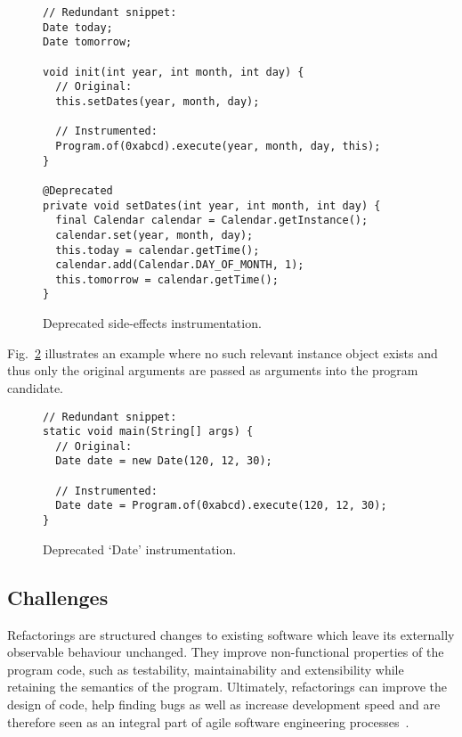 \documentclass[runningheads,a4paper]{llncs}
\begin{document}
\begin{figure}
\begin{lstlisting}[mathescape=true,showstringspaces=false]
// Redundant snippet:
Date today;
Date tomorrow;
  
void init(int year, int month, int day) {
  // Original:
  this.setDates(year, month, day);

  // Instrumented:
  Program.of(0xabcd).execute(year, month, day, this);
}
  
@Deprecated
private void setDates(int year, int month, int day) {
  final Calendar calendar = Calendar.getInstance();
  calendar.set(year, month, day);
  this.today = calendar.getTime();
  calendar.add(Calendar.DAY_OF_MONTH, 1);
  this.tomorrow = calendar.getTime();
}
\end{lstlisting}
\caption{Deprecated side-effects instrumentation.}
\label{ex:side-effects-instrumentation}
\end{figure}

Fig.~\ref{ex:date-instrumentation} illustrates an example where no
such relevant instance object exists and thus only the original
arguments are passed as arguments into the program candidate.

\begin{figure}
\begin{lstlisting}[mathescape=true,showstringspaces=false]
// Redundant snippet:
static void main(String[] args) {
  // Original:
  Date date = new Date(120, 12, 30);

  // Instrumented:
  Date date = Program.of(0xabcd).execute(120, 12, 30);
}
\end{lstlisting}
\caption{Deprecated `Date' instrumentation.}
\label{ex:date-instrumentation}
\end{figure}


\subsection{Challenges}



Refactorings are structured changes to existing software which leave its
externally observable behaviour unchanged.  They improve non-functional
properties of the program code, such as testability, maintainability and
extensibility while retaining the semantics of the program.  Ultimately,
refactorings can improve the design of code, help finding bugs as well
as increase development speed and are therefore seen as an integral part
of agile software engineering processes~\cite{DBLP:conf/xpu/Kerievsky04b,
Fowler1999}.
\end{document}
